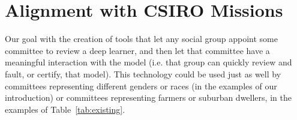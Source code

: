


\section{Alignment with  CSIRO Missions}
Our goal with {\IT} the creation of tools that let any social group appoint some committee to
review a deep learner, and then let that committee have a meaningful interaction with the model (i.e. that group can 
quickly review and  fault,
or  certify, that model). This technology could be used just as well by committees representing different genders or races (in the examples
of our introduction) or committees representing farmers or suburban dwellers, in the examples of Table~\ref{tab:existing}. 

